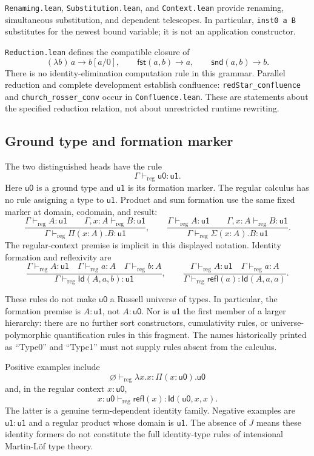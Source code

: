 \documentclass[11pt]{article}
\newcommand{\code}[1]{\nolinkurl{#1}}
\newcommand{\uZ}{\mathsf{u0}}
\newcommand{\uO}{\mathsf{u1}}
\newcommand{\reg}{\vdash_{\mathrm{reg}}}
\newcommand{\Id}{\mathsf{Id}}
\newcommand{\refl}{\mathsf{refl}}
\begin{document}
\code{Renaming.lean}, \code{Substitution.lean}, and \code{Context.lean}
provide renaming, simultaneous substitution, and dependent telescopes.
In particular, \code{inst0 a B} substitutes for the newest bound variable;
it is not an application constructor.

\code{Reduction.lean} defines the compatible closure of
\[
  (\lambda b)\,a \longrightarrow b[a/0],
  \qquad \mathsf{fst}(a,b)\longrightarrow a,
  \qquad \mathsf{snd}(a,b)\longrightarrow b.
\]
There is no identity-elimination computation rule in this grammar.
Parallel reduction and complete development establish confluence:
\code{redStar_confluence} and \code{church_rosser_conv} occur in
\code{Confluence.lean}. These are statements about the specified reduction
relation, not about unrestricted runtime rewriting.

\subsection{Ground type and formation marker}

The two distinguished heads have the rule
\[
  \Gamma\reg \uZ:\uO.
\]
Here $\uZ$ is a ground type and $\uO$ is its formation marker. The regular
calculus has no rule assigning a type to $\uO$.
Product and sum formation use the same fixed marker at domain, codomain,
and result:
\[
  \frac{\Gamma\reg A:\uO\qquad
        \Gamma,x:A\reg B:\uO}
       {\Gamma\reg \Pi(x:A).B:\uO},
  \qquad
  \frac{\Gamma\reg A:\uO\qquad
        \Gamma,x:A\reg B:\uO}
       {\Gamma\reg \Sigma(x:A).B:\uO}.
\]
The regular-context premise is implicit in this displayed notation.
Identity formation and reflexivity are
\[
  \frac{\Gamma\reg A:\uO\quad
        \Gamma\reg a:A\quad\Gamma\reg b:A}
       {\Gamma\reg \Id(A,a,b):\uO},
  \qquad
  \frac{\Gamma\reg A:\uO\quad\Gamma\reg a:A}
       {\Gamma\reg \refl(a):\Id(A,a,a)}.
\]

These rules do not make $\uZ$ a Russell universe of types. In particular,
the formation premise is $A:\uO$, not $A:\uZ$.
Nor is $\uO$ the first member of a larger hierarchy:
there are no further sort constructors, cumulativity rules, or
universe-polymorphic quantification rules in this fragment.
The names historically printed as “Type0” and “Type1” must not supply
rules absent from the calculus.

Positive examples include
\[
  \varnothing\reg \lambda x.x:\Pi(x:\uZ).\uZ
\]
and, in the regular context $x:\uZ$,
\[
  x:\uZ\reg \refl(x):\Id(\uZ,x,x).
\]
The latter is a genuine term-dependent identity family.
Negative examples are $\uO:\uO$ and a regular product whose domain is $\uO$.
The absence of $J$ means these identity formers do not constitute the full
identity-type rules of intensional Martin-L\"of type theory.
\end{document}

